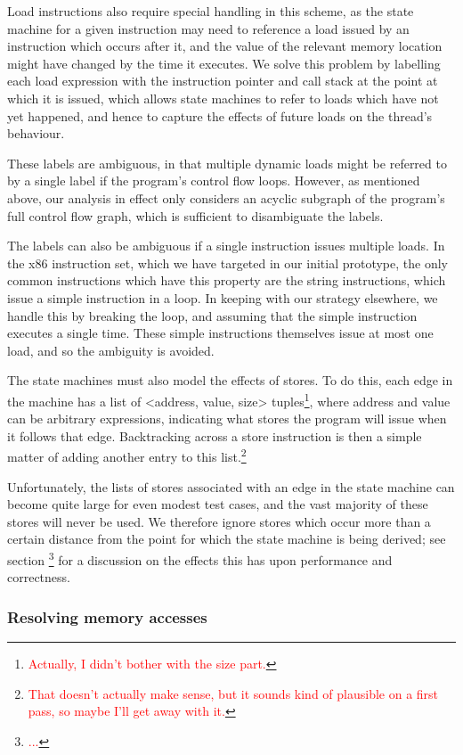 \documentclass[10pt,twocolumn,preprint,natbib,authoryear]{sigplanconf}
\newcommand{\editorial}[1]{\textcolor{red}{\footnote{\textcolor{red}{#1}}}}
\begin{document}
Load instructions also require special handling in this scheme, as the
state machine for a given instruction may need to reference a load
issued by an instruction which occurs after it, and the value of the
relevant memory location might have changed by the time it executes.
We solve this problem by labelling each load expression with the
instruction pointer and call stack at the point at which it is issued,
which allows state machines to refer to loads which have not yet
happened, and hence to capture the effects of future loads on the
thread's behaviour.

These labels are ambiguous, in that multiple dynamic loads might be
referred to by a single label if the program's control flow loops.
However, as mentioned above, our analysis in effect only considers an
acyclic subgraph of the program's full control flow graph, which is
sufficient to disambiguate the labels.

The labels can also be ambiguous if a single instruction issues
multiple loads.  In the x86 instruction set, which we have targeted in
our initial prototype, the only common instructions which have this
property are the string instructions, which issue a simple instruction
in a loop.  In keeping with our strategy elsewhere, we handle this by
breaking the loop, and assuming that the simple instruction executes a
single time.  These simple instructions themselves issue at most one
load, and so the ambiguity is avoided.

The state machines must also model the effects of stores.  To do this,
each edge in the machine has a list of <address, value, size>
tuples\editorial{Actually, I didn't bother with the size part.}, where
address and value can be arbitrary expressions, indicating what stores
the program will issue when it follows that edge.  Backtracking across
a store instruction is then a simple matter of adding another entry to
this list.\editorial{That doesn't actually make sense, but it sounds
  kind of plausible on a first pass, so maybe I'll get away with it.}

Unfortunately, the lists of stores associated with an edge in the
state machine can become quite large for even modest test cases, and
the vast majority of these stores will never be used.  We therefore
ignore stores which occur more than a certain distance from the point
for which the state machine is being derived; see section
\editorial{...} for a discussion on the effects this has upon
performance and correctness.

\subsubsection{Resolving memory accesses}
\end{document}
